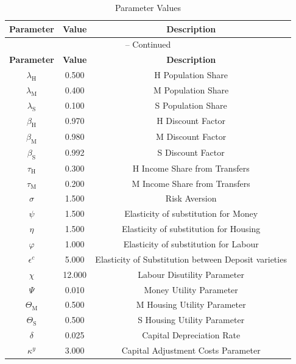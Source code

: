 \begin{center}
\begin{longtable}{ccc}
\caption{Parameter Values}\\%
\toprule%
\multicolumn{1}{c}{\textbf{Parameter}} &
\multicolumn{1}{c}{\textbf{Value}} &
 \multicolumn{1}{c}{\textbf{Description}}\\%
\midrule%
\endfirsthead
\multicolumn{3}{c}{{\tablename} \thetable{} -- Continued}\\%
\midrule%
\multicolumn{1}{c}{\textbf{Parameter}} &
\multicolumn{1}{c}{\textbf{Value}} &
  \multicolumn{1}{c}{\textbf{Description}}\\%
\midrule%
\endhead
$\lambda_\mathrm{H}$ 	 & 	 0.500 	 & 	 H Population Share\\
$\lambda_\mathrm{M}$ 	 & 	 0.400 	 & 	 M Population Share\\
$\lambda_\mathrm{S}$ 	 & 	 0.100 	 & 	 S Population Share\\
$\beta_\mathrm{H}$ 	 & 	 0.970 	 & 	 H Discount Factor\\
$\beta_\mathrm{M}$ 	 & 	 0.980 	 & 	 M Discount Factor\\
$\beta_\mathrm{S}$ 	 & 	 0.992 	 & 	 S Discount Factor\\
$\tau_\mathrm{H}$ 	 & 	 0.300 	 & 	 H Income Share from Transfers\\
$\tau_\mathrm{M}$ 	 & 	 0.200 	 & 	 M Income Share from Transfers\\
$\sigma$ 	 & 	 1.500 	 & 	 Risk Aversion\\
$\psi$ 	 & 	 1.500 	 & 	 Elasticity of substitution for Money\\
$\eta$ 	 & 	 1.500 	 & 	 Elasticity of substitution for Housing\\
$\varphi$ 	 & 	 1.000 	 & 	 Elasticity of substitution for Labour\\
$\epsilon^c$ 	 & 	 5.000 	 & 	 Elasticity of Substitution between Deposit varieties\\
$\chi$ 	 & 	 12.000 	 & 	 Labour Disutility Parameter\\
$\Psi$ 	 & 	 0.010 	 & 	 Money Utility Parameter\\
$\Theta_\mathrm{M}$ 	 & 	 0.500 	 & 	 M Housing Utility Parameter\\
$\Theta_\mathrm{S}$ 	 & 	 0.500 	 & 	 S Housing Utility Parameter\\
$\delta$ 	 & 	 0.025 	 & 	 Capital Depreciation Rate\\
$\kappa^y$ 	 & 	 3.000 	 & 	 Capital Adjustment Costs Parameter\\

\end{longtable}
\end{center}
